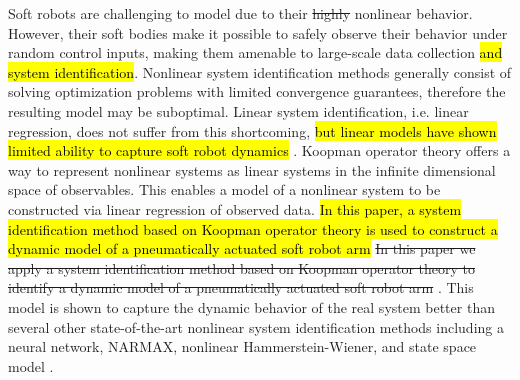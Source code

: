 Soft robots are challenging to model due to their \sout{highly}  nonlinear behavior.
However, their soft bodies make it possible to safely observe their behavior under random control inputs, making them amenable to large-scale data collection \hl{and system identification}.
Nonlinear system identification methods generally consist of solving optimization problems with limited convergence guarantees, therefore the resulting model may be suboptimal.
Linear system identification, i.e. linear regression, does not suffer from this shortcoming, \hl{but linear models have shown limited ability to capture soft robot dynamics} .
Koopman operator theory offers a way to represent nonlinear systems as linear systems in the infinite dimensional space of observables.
This enables a model of a nonlinear system to be constructed via linear regression of observed data.
\hl{In this paper, a system identification method based on Koopman operator theory is used to construct a dynamic model of a pneumatically actuated soft robot arm}
\sout{In this paper we apply a system identification method based on Koopman operator theory to identify a dynamic model of a pneumatically actuated soft robot arm} .
This model is shown to capture the dynamic behavior of the real system better than several other  state-of-the-art  nonlinear  system identification  methods  including  a  neural  network, NARMAX, nonlinear Hammerstein-Wiener, and state space model .